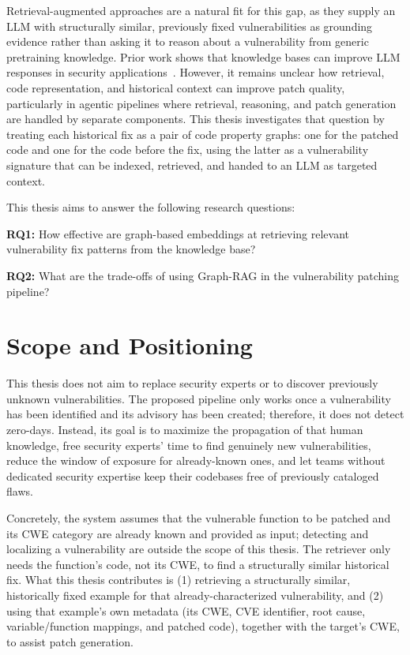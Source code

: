 Retrieval-augmented approaches are a natural fit for this gap, as they supply an LLM with structurally similar, previously fixed vulnerabilities as grounding evidence rather than asking it to reason about a vulnerability from generic pretraining knowledge.
Prior work shows that knowledge bases can improve LLM responses in security applications~\cite{Seo2025AutoPatchMF, guo2025bluecodeagentblueteamingagent}.
However, it remains unclear how retrieval, code representation, and historical context can improve patch quality, particularly in agentic pipelines where retrieval, reasoning, and patch generation are handled by separate components.
This thesis investigates that question by treating each historical fix as a pair of code property graphs: one for the patched code and one for the code before the fix, using the latter as a vulnerability signature that can be indexed, retrieved, and handed to an LLM as targeted context.

This thesis aims to answer the following research questions:

\textbf{RQ1:} How effective are graph-based embeddings at retrieving relevant vulnerability fix patterns from the knowledge base?

\textbf{RQ2:} What are the trade-offs of using Graph-RAG in the vulnerability patching pipeline? 

\section{Scope and Positioning}

This thesis does not aim to replace security experts or to discover previously unknown vulnerabilities.
The proposed pipeline only works once a vulnerability has been identified and its advisory has been created; therefore, it does not detect zero-days.
Instead, its goal is to maximize the propagation of that human knowledge, free security experts' time to find genuinely new vulnerabilities, reduce the window of exposure for already-known ones, and let teams without dedicated security expertise keep their codebases free of previously cataloged flaws.

Concretely, the system assumes that the vulnerable function to be patched and its CWE category are already known and provided as input; detecting and localizing a vulnerability are outside the scope of this thesis. The retriever only needs the function's code, not its CWE, to find a structurally similar historical fix. 
What this thesis contributes is (1) retrieving a structurally similar, historically fixed example for that already-characterized vulnerability, and (2) using that example's own metadata (its CWE, CVE identifier, root cause, variable/function mappings, and patched code), together with the target's CWE, to assist patch generation.


